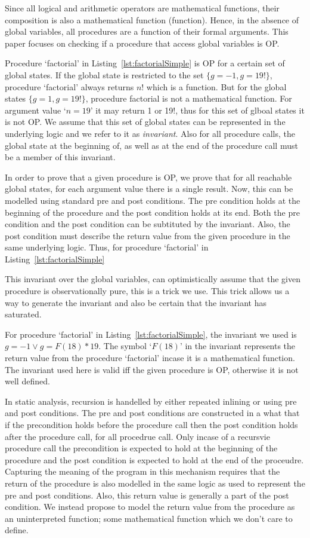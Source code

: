\documentclass{llncs}
\newcommand{\F}{\mathit{F}}
\newcommand{\g}{\textit{g}}
\begin{document}
Since all logical and arithmetic operators are mathematical functions,
their composition is also a mathematical function (function). Hence,
in the absence of global variables, all procedures are a function of
their formal arguments. This paper focuses on checking if a procedure
that access global variables is OP. 

Procedure `factorial' in Listing~\ref{lst:factorialSimple} is OP for a
certain set of global states. If the global state is restricted to the
set $\{g = -1, g = 19!\}$, procedure `factorial' always returns $n!$
which is a function. But for the global states $\{g =1, g = 19!\}$,
procedure factorial is not a mathematical function. For argument value
`$n = 19$' it may return 1 or 19!, thus for this set of glboal states
it is not OP. We assume that this set of global states can be
represented in the underlying logic and we refer to it as
\textit{invariant}. Also for all procedure calls, the global state at
the beginning of, as well as at the end of the procedure call must be
a member of this invariant.

In order to prove that a given procedure is OP, we prove that for all
reachable global states, for each argument value there is a single
result. Now, this can be modelled using standard pre and post
conditions. The pre condition holds at the beginning of the procedure
and the post condition holds at its end. Both the pre condition and
the post condition can be subtituted by the invariant. Also, the post
condition must describe the return value from the given procedure in
the same underlying logic. Thus, for procedure `factorial' in
Listing~\ref{lst:factorialSimple} 

This invariant over the global variables, can optimistically
assume that the given procedure is observationally pure, this is a
trick we use. This trick allows us a way to generate the invariant and
also be certain that the invariant has saturated.

For procedure `factorial' in Listing~\ref{lst:factorialSimple}, the
invariant we used is $\g = -1 \vee g = \F(18) * 19$. The symbol
`$\F(18)$' in the invariant represents the return value from the
procedure `factorial' incase it is a mathematical function. The
invariant used here is valid iff the given procedure is OP, otherwise
it is not well defined. 

In static analysis, recursion is handelled by either repeated inlining
or using pre and post conditions. The pre and post conditions are
constructed in a what that if the precondition holds before the
procedure call then the post condition holds after the procedure call,
for all procedrue call. Only incase of a recursvie procedure call the
precondition is expected to hold at the beginning of the procedure and
the post condition is expected to hold at the end of the proceudre. 
Capturing the meaning of the program in this mechanism requires that
the return of the procedure is also modelled in the same logic as used
to represent the pre and post conditions. Also, this return value is
generally a part of the post condition. We instead propose to
model the return value from the procedure as an uninterpreted
function; some mathematical function which we don't care to define. 
\end{document}
